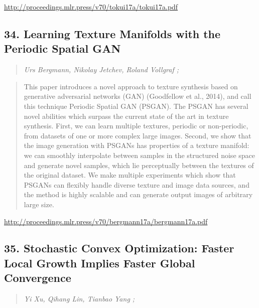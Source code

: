 \documentclass{article}
\begin{document}
\href{http://proceedings.mlr.press/v70/tokui17a/tokui17a.pdf}{http://proceedings.mlr.press/v70/tokui17a/tokui17a.pdf}

\subsection{34. Learning Texture Manifolds with the Periodic Spatial GAN}

\begin{quote}
\footnotesize{\textit{Urs Bergmann, Nikolay Jetchev, Roland Vollgraf ;}}
\end{quote}

\begin{quote}
    This paper introduces a novel approach to texture synthesis based on generative adversarial networks (GAN) (Goodfellow et al., 2014), and call this technique Periodic Spatial GAN (PSGAN). The PSGAN has several novel abilities which surpass the current state of the art in texture synthesis. First, we can learn multiple textures, periodic or non-periodic, from datasets of one or more complex large images. Second, we show that the image generation with PSGANs has properties of a texture manifold: we can smoothly interpolate between samples in the structured noise space and generate novel samples, which lie perceptually between the textures of the original dataset. We make multiple experiments which show that PSGANs can flexibly handle diverse texture and image data sources, and the method is highly scalable and can generate output images of arbitrary large size.  \end{quote}

\href{http://proceedings.mlr.press/v70/bergmann17a/bergmann17a.pdf}{http://proceedings.mlr.press/v70/bergmann17a/bergmann17a.pdf}

\subsection{35. Stochastic Convex Optimization: Faster Local Growth Implies Faster Global Convergence}

\begin{quote}
\footnotesize{\textit{Yi Xu, Qihang Lin, Tianbao Yang ;}}
\end{quote}
\end{document}
